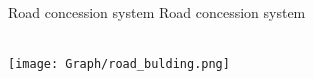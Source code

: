 \documentclass[9pt]{beamer}
\begin{document}
\begin{frame}{Road concession system } \label{roads1} 
Road concession system \\~\\
\hyperlink{concession}{}   \label{concession_anexo}
 
\centering\texttt{[image: Graph/road\_bulding.png]}
 
 
\end{frame}


 



   



\end{document}
